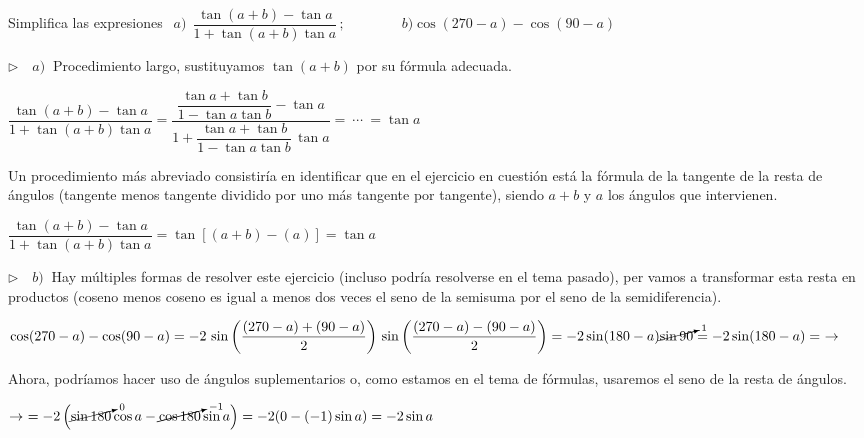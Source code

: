 \begin{miejemplo}

Simplifica las expresiones $\ \ a)\ \ \dfrac{\tan(a+b)-\tan a}{1+\tan(a+b)\tan a} \, ; \qquad \qquad b) \cos(270-a)-\cos(90-a)$	

\vspace{5mm} $\triangleright \quad a) \ $ Procedimiento largo, sustituyamos $\tan(a+b)$ por su fórmula adecuada.

\vspace{2mm} $ \dfrac{\tan(a+b)-\tan a}{1+\tan(a+b)\tan a} =  
\dfrac{\dfrac{\tan a+\tan b}{1-\tan a \tan b} -\tan a}{1+ \dfrac{\tan a+\tan b}{1-\tan a \tan b} \, \tan a} = \ \cdots \ = \tan a$

\vspace{2mm} Un procedimiento más abreviado consistiría en identificar que en el ejercicio en cuestión está la fórmula de la tangente de la resta de ángulos \textcolor{gris}{(tangente menos tangente dividido por uno más tangente por tangente)}, siendo $a + b$ y $a$ los ángulos que intervienen.

\vspace{2mm} $\dfrac{\tan(a+b)-\tan a}{1+\tan(a+b)\tan a} = \tan [ (a+b) - (a) ] = \tan a$


\vspace{5mm} $\triangleright \quad b)\ $ Hay múltiples formas de resolver este ejercicio (incluso podría resolverse en el tema pasado), per vamos a transformar esta resta en productos \textcolor{gris}{(coseno menos coseno es igual a menos dos veces el seno de la semisuma por el seno de la semidiferencia).}

\vspace{2mm}  $\cos(270-a)-\cos(90-a) = -2 \, \sin \left( \dfrac {(270-a)+(90-a)}{2} \right) \, \sin \left( \dfrac {(270-a)-(90-a)}{2} \right) = -2 \sin (180-a) \cancelto{1}{\sin 90}= -2\sin(180-a) = \ \to $

\vspace{2mm} Ahora, podríamos hacer uso de ángulos suplementarios o, como estamos en el tema de fórmulas, usaremos el seno de la resta de ángulos.

\vspace{2mm} $\to \ = -2 \left( \cancelto{0}{\sin 180} \cos a - \cancelto{-1}{\cos 180} \sin a \right)=-2(0-(-1)\sin a)=-2\sin a$
\end{miejemplo}

